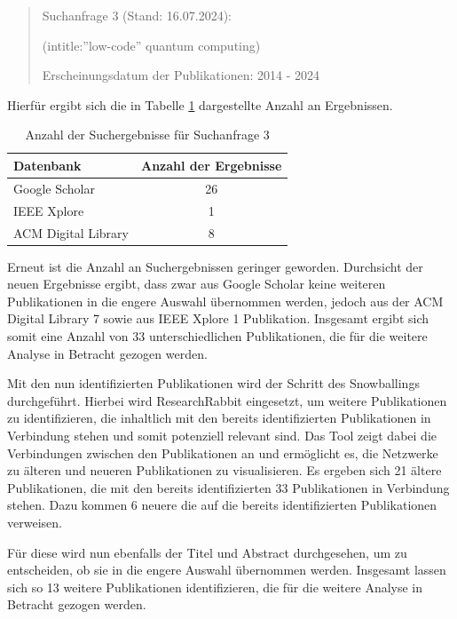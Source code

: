 \begin{quote}
    Suchanfrage 3 (Stand: 16.07.2024):

    (intitle:''low-code'' quantum computing)

    Erscheinungsdatum der Publikationen: 2014 - 2024
\end{quote}

Hierfür ergibt sich die in Tabelle \ref{tab:search_3_results} dargestellte Anzahl an Ergebnissen. 

\begin{table}[h!]
    \centering
    \caption{Anzahl der Suchergebnisse für Suchanfrage 3}
    \label{tab:search_3_results}
    \begin{tabular}{|l|c|}
    \hline
    \textbf{Datenbank} & \textbf{Anzahl der Ergebnisse} \\ \hline
    Google Scholar & 26 \\ \hline
    IEEE Xplore & 1 \\ \hline
    ACM Digital Library & 8 \\ \hline
    \end{tabular}
\end{table}

Erneut ist die Anzahl an Suchergebnissen geringer geworden. Durchsicht der neuen Ergebnisse ergibt, dass zwar aus Google Scholar 
keine weiteren Publikationen in die engere Auswahl übernommen werden, jedoch aus der ACM Digital Library 7 sowie aus IEEE Xplore 1 Publikation. 
Insgesamt ergibt sich somit eine Anzahl von 33 unterschiedlichen Publikationen, die für die weitere Analyse in Betracht gezogen werden. 

Mit den nun identifizierten Publikationen wird der Schritt des Snowballings durchgeführt. Hierbei wird ResearchRabbit eingesetzt, um 
weitere Publikationen zu identifizieren, die inhaltlich mit den bereits identifizierten Publikationen in Verbindung stehen und somit 
potenziell relevant sind. Das Tool zeigt dabei die Verbindungen zwischen den Publikationen an und ermöglicht es, die Netzwerke 
zu älteren und neueren Publikationen zu visualisieren. Es ergeben sich 21 ältere Publikationen, die mit den bereits identifizierten 33 
Publikationen in Verbindung stehen. Dazu kommen 6 neuere die auf die bereits identifizierten Publikationen verweisen. 

Für diese wird nun ebenfalls der Titel und Abstract durchgesehen, um zu entscheiden, ob sie in die engere Auswahl übernommen werden. 
Insgesamt lassen sich so 13 weitere Publikationen identifizieren, die für die weitere Analyse in Betracht gezogen werden. 

